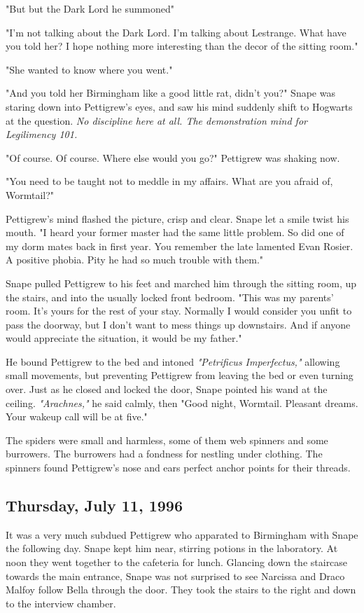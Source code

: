 "But{\el} but the Dark Lord{\el} he summoned{\el}"

"I'm not talking about the Dark Lord. I'm talking about Lestrange. What have you told her? I hope nothing more interesting than the decor of the sitting room."

"She{\el} wanted to know where you went."

"And you told her Birmingham like a good little rat, didn't you?" Snape was staring down into Pettigrew's eyes, and saw his mind suddenly shift to Hogwarts at the question. \emph{No discipline here at all. The demonstration mind for Legilimency 101.}

"Of course. Of course. Where else would you go?" Pettigrew was shaking now.

"You need to be taught not to meddle in my affairs. What are you afraid of, Wormtail?"

Pettigrew's mind flashed the picture, crisp and clear. Snape let a smile twist his mouth. "I heard your former master had the same little problem. So did one of my dorm mates back in first year. You remember the late lamented Evan Rosier. A positive phobia. Pity he had so much trouble with them."

Snape pulled Pettigrew to his feet and marched him through the sitting room, up the stairs, and into the usually locked front bedroom. "This was my parents' room. It's yours for the rest of your stay. Normally I would consider you unfit to pass the doorway, but I don't want to mess things up downstairs. And if anyone would appreciate the situation, it would be my father."

He bound Pettigrew to the bed and intoned \emph{"Petrificus Imperfectus,"} allowing small movements, but preventing Pettigrew from leaving the bed or even turning over. Just as he closed and locked the door, Snape pointed his wand at the ceiling. \emph{"Arachnes,"} he said calmly, then "Good night, Wormtail. Pleasant dreams. Your wakeup call will be at five."

The spiders were small and harmless, some of them web spinners and some burrowers. The burrowers had a fondness for nestling under clothing. The spinners found Pettigrew's nose and ears perfect anchor points for their threads.

\subsection{Thursday, July 11, 1996}

It was a very much subdued Pettigrew who apparated to Birmingham with Snape the following day. Snape kept him near, stirring potions in the laboratory. At noon they went together to the cafeteria for lunch. Glancing down the staircase towards the main entrance, Snape was not surprised to see Narcissa and Draco Malfoy follow Bella through the door. They took the stairs to the right and down to the interview chamber.

